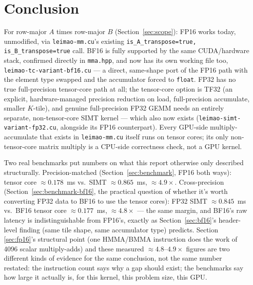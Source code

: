 \documentclass[11pt]{article}
\begin{document}
\section{Conclusion}

For row-major $A$ times row-major $B$ (Section~\ref{sec:scope}): FP16 works today,
unmodified, via \texttt{leimao-mm.cu}'s existing \texttt{is\_A\_transpose=true,
is\_B\_transpose=true} call. BF16 is fully supported by the same CUDA/hardware stack,
confirmed directly in \texttt{mma.hpp}, and now has its own working file too,
\texttt{leimao-tc-variant-bf16.cu} --- a direct, same-shape port of the FP16 path with the
element type swapped and the accumulator forced to \texttt{float}. FP32 has no true
full-precision tensor-core path at all; the tensor-core option is TF32 (an explicit,
hardware-managed precision reduction on load, full-precision accumulate, smaller
$K$-tile), and genuine full-precision FP32 GEMM needs an entirely separate,
non-tensor-core SIMT kernel --- which also now exists
(\texttt{leimao-simt-variant-fp32.cu}, alongside its FP16 counterpart). Every GPU-side
multiply-accumulate that exists in \texttt{leimao-mm.cu} itself runs on tensor cores; its
only non-tensor-core matrix multiply is a CPU-side correctness check, not a GPU kernel.

Two real benchmarks put numbers on what this report otherwise only described
structurally. Precision-matched (Section~\ref{sec:benchmark}, FP16 both ways): tensor
core $\approx 0.178$~ms vs.\ SIMT $\approx 0.865$~ms, $\approx\!4.9\times$. Cross-precision
(Section~\ref{sec:benchmark-bf16}, the practical question of whether it's worth
converting FP32 data to BF16 to use the tensor cores): FP32 SIMT $\approx 0.845$~ms vs.\
BF16 tensor core $\approx 0.177$~ms, $\approx\!4.8\times$ --- the same margin, and BF16's
raw latency is indistinguishable from FP16's, exactly as Section~\ref{sec:bf16}'s
header-level finding (same tile shape, same accumulator type) predicts. Section
\ref{sec:fp16}'s structural point (one HMMA/BMMA instruction does the work of 4096 scalar
multiply-adds) and these measured $\approx\!4.8$--$4.9\times$ figures are two different
kinds of evidence for the same conclusion, not the same number restated: the instruction
count says why a gap should exist; the benchmarks say how large it actually is, for this
kernel, this problem size, this GPU.
\end{document}
